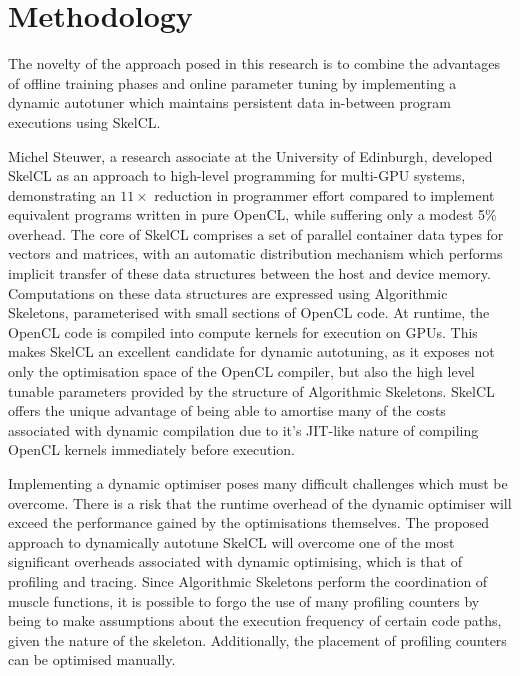 \section{Methodology}

The novelty of the approach posed in this research is to combine the
advantages of offline training phases and online parameter tuning by
implementing a dynamic autotuner which maintains persistent data
in-between program executions using SkelCL.

Michel Steuwer, a research associate at the University of Edinburgh,
developed SkelCL as an approach to high-level programming for
multi-GPU systems, demonstrating an $11\times$ reduction in programmer
effort compared to implement equivalent programs written in pure
OpenCL, while suffering only a modest 5\% overhead. The core of SkelCL
comprises a set of parallel container data types for vectors and
matrices, with an automatic distribution mechanism which performs
implicit transfer of these data structures between the host and device
memory. Computations on these data structures are expressed using
Algorithmic Skeletons, parameterised with small sections of OpenCL
code. At runtime, the OpenCL code is compiled into compute kernels for
execution on GPUs. This makes SkelCL an excellent candidate for
dynamic autotuning, as it exposes not only the optimisation space of
the OpenCL compiler, but also the high level tunable parameters
provided by the structure of Algorithmic Skeletons. SkelCL offers the
unique advantage of being able to amortise many of the costs
associated with dynamic compilation due to it's JIT-like nature of
compiling OpenCL kernels immediately before execution.

Implementing a dynamic optimiser poses many difficult challenges which
must be overcome. There is a risk that the runtime overhead of the
dynamic optimiser will exceed the performance gained by the
optimisations themselves. The proposed approach to dynamically
autotune SkelCL will overcome one of the most significant overheads
associated with dynamic optimising, which is that of profiling and
tracing. Since Algorithmic Skeletons perform the coordination of
muscle functions, it is possible to forgo the use of many profiling
counters by being to make assumptions about the execution frequency of
certain code paths, given the nature of the skeleton. Additionally,
the placement of profiling counters can be optimised manually.

~\cite{Steuwer2011, Steuwer2013a}

